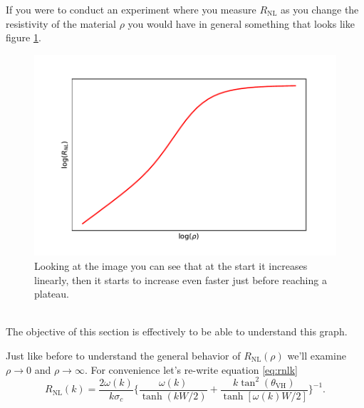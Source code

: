 If you were to conduct an experiment where you measure $R_{\textrm{NL}}$ as you change the resistivity of the material $\rho$ you would have in general something that looks like figure \ref{fig:rho0}.
\begin{figure}[h!]
    \centering
    \includegraphics[width=\linewidth]{Immagini/rnl/rho0.pdf}
    \caption{Looking at the image you can see that at the start it increases linearly, then it starts to increase even faster just before reaching a plateau.}
    \label{fig:rho0}
\end{figure}\\
The objective of this section is effectively to be able to understand this graph.

Just like before to understand the general behavior of $R_{\textrm{NL}}(\rho)$ we'll examine $\rho\to 0$ and $\rho \to \infty$. For convenience let's re-write equation \ref{eq:rnlk}
\[
    R_{\textrm{NL}}(k)=\frac{2\omega(k)}{k\sigma_c}
    \bigg\{
        \frac{\omega(k)}{\tanh(kW/2)} + \frac{k\tan^2(\theta_{\textrm{VH}})}{\tanh[\omega(k)W/2]}    
    \bigg\}^{-1}.
\]
















